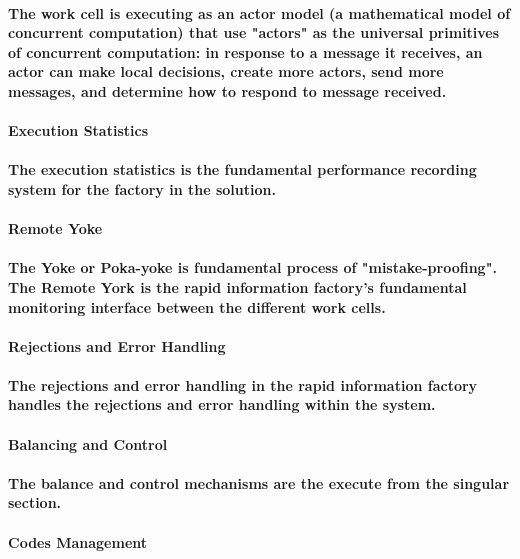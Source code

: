 \documentclass{acm_proc_article-sp}
\begin{document}
\paragraph{The work cell is executing as an actor model (a mathematical model of concurrent computation) that use "actors" as the universal primitives of concurrent computation: in response to a message it receives, an actor can make local decisions, create more actors, send more messages, and determine how to respond to message received.}
\paragraph{\textbf{Execution Statistics}}
\paragraph{The execution statistics is the fundamental performance recording system for the factory in the solution.}
\paragraph{\textbf{Remote Yoke}}
\paragraph{The Yoke or Poka-yoke is fundamental process of "mistake-proofing". The Remote York is the rapid information factory's fundamental monitoring interface between the different work cells. }
\paragraph{\textbf{Rejections and Error Handling}}
\paragraph{The rejections and error handling in the rapid information factory handles the rejections and error handling within the system.}
\paragraph{Balancing and Control}
\paragraph{The balance and control mechanisms are the execute from the singular section.}
\paragraph{Codes Management}
\end{document}
